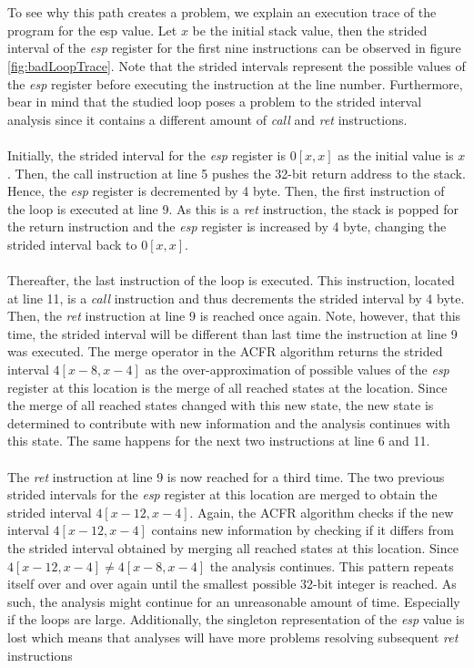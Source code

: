 \documentclass{kththesis}
\renewcommand{\it}[1]{\textit{#1}}
\begin{document}
\noindent
\\ \\
To see why this path creates a problem, we explain an execution trace of the program for the esp value. Let $x$ be the initial stack value, then the strided interval of the \it{esp} register for the first nine instructions can be observed in figure \ref{fig:badLoopTrace}. Note that the strided intervals represent the possible values of the \it{esp} register before executing the instruction at the line number. Furthermore, bear in mind that the studied loop poses a problem to the strided interval analysis since it contains a different amount of \it{call} and \it{ret} instructions.
\\ \\
Initially, the strided interval for the \it{esp} register is $0[x,x]$ as the initial value is $x$. Then, the call instruction at line 5 pushes the 32-bit return address to the stack. Hence, the \it{esp} register is decremented by 4 byte. Then, the first instruction of the loop is executed at line 9. As this is a \it{ret} instruction, the stack is popped for the return instruction and the \it{esp} register is increased by 4 byte, changing the strided interval back to $0[x,x]$. 
\\ \\
Thereafter, the last instruction of the loop is executed. This instruction, located at line 11, is a \it{call} instruction and thus decrements the strided interval by 4 byte. Then, the \it{ret} instruction at line 9 is reached once again. Note, however, that this time, the strided interval will be different than last time the instruction at line 9 was executed. The merge operator in the ACFR algorithm returns the strided interval $4[x-8,x-4]$ as the over-approximation of possible values of the \it{esp} register at this location is the merge of all reached states at the location. Since the merge of all reached states changed with this new state, the new state is determined to contribute with new information and the analysis continues with this state. The same happens for the next two instructions at line 6 and 11.
\\ \\
The \it{ret} instruction at line 9 is now reached for a third time. The two previous strided intervals for the \it{esp} register at this location are merged to obtain the strided interval $4[x-12,x-4]$. Again, the ACFR algorithm checks if the new interval $4[x-12,x-4]$ contains new information by checking if it differs from the strided interval obtained by merging all reached states at this location. Since $4[x-12,x-4] \neq 4[x-8,x-4]$ the analysis continues.
\clearpage
\noindent
This pattern repeats itself over and over again until the smallest possible 32-bit integer is reached. As such, the analysis might continue for an unreasonable amount of time. Especially if the loops are large. Additionally, the singleton representation of the \it{esp} value is lost which means that analyses will have more problems resolving subsequent \it{ret} instructions
\end{document}
